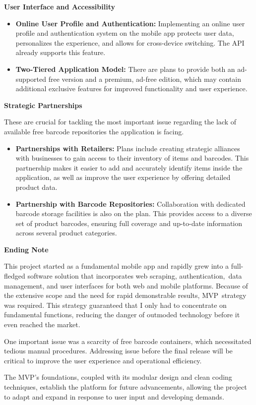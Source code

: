 \pagebreak

\noindent\textbf{User Interface and Accessibility}

\begin{itemize}
	\item \textbf{Online User Profile and Authentication:} Implementing an online user profile and authentication system on the mobile app protects user data, personalizes the experience, and allows for cross-device switching. The API already supports this feature.
	\item \textbf{Two-Tiered Application Model:} There are plans to provide both an ad-supported free version and a premium, ad-free edition, which may contain additional exclusive features for improved functionality and user experience.
\end{itemize}

\noindent\textbf{Strategic Partnerships}

These are crucial for tackling the most important issue regarding the lack of available free barcode repositories the application is facing.

\begin{itemize}
	\item \textbf{Partnerships with Retailers:} Plans include creating strategic alliances with businesses to gain access to their inventory of items and barcodes. This partnership makes it easier to add and accurately identify items inside the application, as well as improve the user experience by offering detailed product data.
	\item \textbf{Partnership with Barcode Repositories:} Collaboration with dedicated barcode storage facilities is also on the plan. This provides access to a diverse set of product barcodes, ensuring full coverage and up-to-date information across several product categories.
\end{itemize}

\noindent\textbf{Ending Note}

This project started as a fundamental mobile app and rapidly grew into a full-fledged software solution that incorporates web scraping, authentication, data management, and user interfaces for both web and mobile platforms. Because of the extensive scope and the need for rapid demonstrable results, MVP strategy was required. This strategy guaranteed that I only had to concentrate on fundamental functions, reducing the danger of outmoded technology before it even reached the market.

One important issue was a scarcity of free barcode containers, which necessitated tedious manual procedures. Addressing issue before the final release will be critical to improve the user experience and operational efficiency.

The MVP's foundations, coupled with its modular design and clean coding techniques, establish the platform for future advancements, allowing the project to adapt and expand in response to user input and developing demands.

